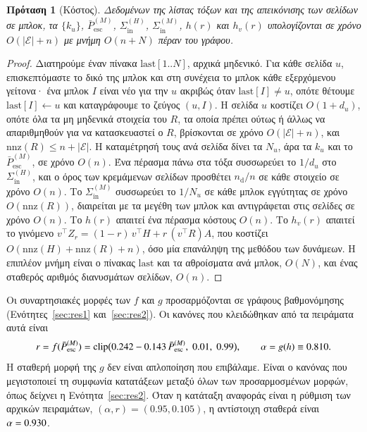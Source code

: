 \documentclass[11pt,a4paper]{article}
\newtheorem{proposition}{Πρόταση}
\theoremstyle{definition}
\theoremstyle{remark}
\newcommand{\Pbar}{\bar P^{(M)}_{\mathrm{esc}}}
\newcommand{\Sin}{\Sigma_{\mathrm{in}}}
\newcommand{\clip}{\mathrm{clip}}
\begin{document}
\begin{proposition}[Κόστος]\label{prop:cost}
Δεδομένων της λίστας τόξων και της απεικόνισης των σελίδων σε μπλοκ, τα $\{k_u\}$, $\Pbar$,
$\Sin^{(H)}$, $\Sin^{(M)}$, $h(r)$ και $h_v(r)$ υπολογίζονται σε χρόνο $O(|\mathcal E|+n)$ με μνήμη
$O(n+N)$ πέραν του γράφου.
\end{proposition}
\begin{proof}
Διατηρούμε έναν πίνακα $\mathrm{last}[1..N]$, αρχικά μηδενικό. Για κάθε σελίδα $u$, επισκεπτόμαστε το
δικό της μπλοκ και στη συνέχεια το μπλοκ κάθε εξερχόμενου γείτονα· ένα μπλοκ $I$ είναι νέο για την $u$
ακριβώς όταν $\mathrm{last}[I]\ne u$, οπότε θέτουμε $\mathrm{last}[I]\gets u$ και καταγράφουμε το ζεύγος
$(u,I)$. Η σελίδα $u$ κοστίζει $O(1+d_u)$, οπότε όλα τα μη μηδενικά στοιχεία του $R$, τα οποία πρέπει
ούτως ή άλλως να απαριθμηθούν για να κατασκευαστεί ο $R$, βρίσκονται σε χρόνο $O(|\mathcal E|+n)$, και
$\mathrm{nnz}(R)\le n+|\mathcal E|$. Η καταμέτρησή τους ανά σελίδα δίνει τα $N_u$, άρα τα $k_u$ και το
$\Pbar$, σε χρόνο $O(n)$. Ένα πέρασμα πάνω στα τόξα συσσωρεύει το $1/d_u$ στο $\Sin^{(H)}$, και ο όρος
των κρεμάμενων σελίδων προσθέτει $n_{\mathrm d}/n$ σε κάθε στοιχείο σε χρόνο $O(n)$. Το $\Sin^{(M)}$
συσσωρεύει το $1/N_u$ σε κάθε μπλοκ εγγύτητας σε χρόνο $O(\mathrm{nnz}(R))$, διαιρείται με τα μεγέθη
των μπλοκ και αντιγράφεται στις σελίδες σε χρόνο $O(n)$. Το $h(r)$ απαιτεί ένα πέρασμα κόστους $O(n)$.
Το $h_v(r)$ απαιτεί το γινόμενο $v^\top Z_r=(1-r)\,v^\top H+r\,(v^\top R)A$, που κοστίζει
$O(\mathrm{nnz}(H)+\mathrm{nnz}(R)+n)$, όσο μία επανάληψη της μεθόδου των δυνάμεων. Η επιπλέον μνήμη
είναι ο πίνακας $\mathrm{last}$ και τα αθροίσματα ανά μπλοκ, $O(N)$, και ένας σταθερός αριθμός
διανυσμάτων σελίδων, $O(n)$.
\end{proof}

Οι συναρτησιακές μορφές των $f$ και $g$ προσαρμόζονται σε γράφους βαθμονόμησης
(Ενότητες~\ref{sec:res1} και~\ref{sec:res2}). Οι κανόνες που κλειδώθηκαν από τα πειράματα αυτά είναι
\begin{equation}
r=f(\Pbar)=\clip\bigl(0.242-0.143\,\Pbar,\;0.01,\;0.99\bigr),\qquad \alpha=g(h)\equiv\STwoConstAlpha .
\label{eq:locked}
\end{equation}
Η σταθερή μορφή της $g$ δεν είναι απλοποίηση που επιβάλαμε. Είναι ο κανόνας που μεγιστοποιεί τη
συμφωνία κατατάξεων μεταξύ όλων των προσαρμοσμένων μορφών, όπως δείχνει η Ενότητα~\ref{sec:res2}.
Όταν η κατάταξη αναφοράς είναι η ρύθμιση των αρχικών πειραμάτων, $(\alpha,r)=(0.95,0.105)$, η
αντίστοιχη σταθερά είναι $\alpha=0.930$.
\end{document}
